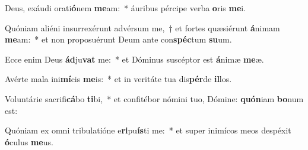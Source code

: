 \item Deus, exáudi orati\textbf{ó}nem \textbf{me}am:~* áuribus pércipe verba \textbf{o}ris \textbf{me}i.
\item Quóniam aliéni insurrexérunt advérsum me,~† et fortes quæsiérunt \textbf{á}nimam \textbf{me}am:~* et non proposuérunt Deum ante con\textbf{spéc}tum \textbf{su}um.
\item Ecce enim Deus \textbf{ád}ju\textbf{vat} me:~* et Dóminus suscéptor est \textbf{á}nimæ \textbf{me}æ.
\item Avérte mala ini\textbf{mí}cis \textbf{me}is:~* et in veritáte tua dis\textbf{pér}de \textbf{il}los.
\item Voluntárie sacrifi\textbf{cá}bo \textbf{ti}bi,~* et confitébor nómini tuo, Dómine: \textbf{quón}iam \textbf{bo}num est:
\item Quóniam ex omni tribulatióne e\textbf{ri}pu\textbf{ís}ti me:~* et super inimícos meos despéxit \textbf{ó}culus \textbf{me}us.
